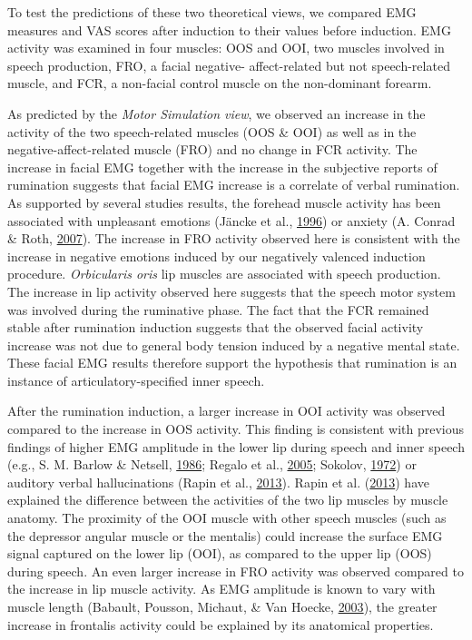 \documentclass[a4paper,12pt,twoside,openright,oldfontcommands]{memoir}
\begin{document}
To test the predictions of these two theoretical views, we compared EMG
measures and VAS scores after induction to their values before
induction. EMG activity was examined in four muscles: OOS and OOI, two
muscles involved in speech production, FRO, a facial negative-
affect-related but not speech-related muscle, and FCR, a non-facial
control muscle on the non-dominant forearm.

As predicted by the \emph{Motor Simulation view}, we observed an
increase in the activity of the two speech-related muscles (OOS \& OOI)
as well as in the negative-affect-related muscle (FRO) and no change in
FCR activity. The increase in facial EMG together with the increase in
the subjective reports of rumination suggests that facial EMG increase
is a correlate of verbal rumination. As supported by several studies
results, the forehead muscle activity has been associated with
unpleasant emotions (Jäncke et al.,
\protect\hyperlink{ref-Jancke1996}{1996}) or anxiety (A. Conrad \& Roth,
\protect\hyperlink{ref-conrad_muscle_2007}{2007}). The increase in FRO
activity observed here is consistent with the increase in negative
emotions induced by our negatively valenced induction procedure.
\emph{Orbicularis oris} lip muscles are associated with speech
production. The increase in lip activity observed here suggests that the
speech motor system was involved during the ruminative phase. The fact
that the FCR remained stable after rumination induction suggests that
the observed facial activity increase was not due to general body
tension induced by a negative mental state. These facial EMG results
therefore support the hypothesis that rumination is an instance of
articulatory-specified inner speech.

After the rumination induction, a larger increase in OOI activity was
observed compared to the increase in OOS activity. This finding is
consistent with previous findings of higher EMG amplitude in the lower
lip during speech and inner speech (e.g., S. M. Barlow \& Netsell,
\protect\hyperlink{ref-barlow_differential_1986}{1986}; Regalo et al.,
\protect\hyperlink{ref-regalo_electromyographic_2005}{2005}; Sokolov,
\protect\hyperlink{ref-sokolov_inner_1972}{1972}) or auditory verbal
hallucinations (Rapin et al.,
\protect\hyperlink{ref-rapin_emg_2013}{2013}). Rapin et al.
(\protect\hyperlink{ref-rapin_emg_2013}{2013}) have explained the
difference between the activities of the two lip muscles by muscle
anatomy. The proximity of the OOI muscle with other speech muscles (such
as the depressor angular muscle or the mentalis) could increase the
surface EMG signal captured on the lower lip (OOI), as compared to the
upper lip (OOS) during speech. An even larger increase in FRO activity
was observed compared to the increase in lip muscle activity. As EMG
amplitude is known to vary with muscle length (Babault, Pousson,
Michaut, \& Van Hoecke,
\protect\hyperlink{ref-babault_effect_2003}{2003}), the greater increase
in frontalis activity could be explained by its anatomical properties.
\end{document}
